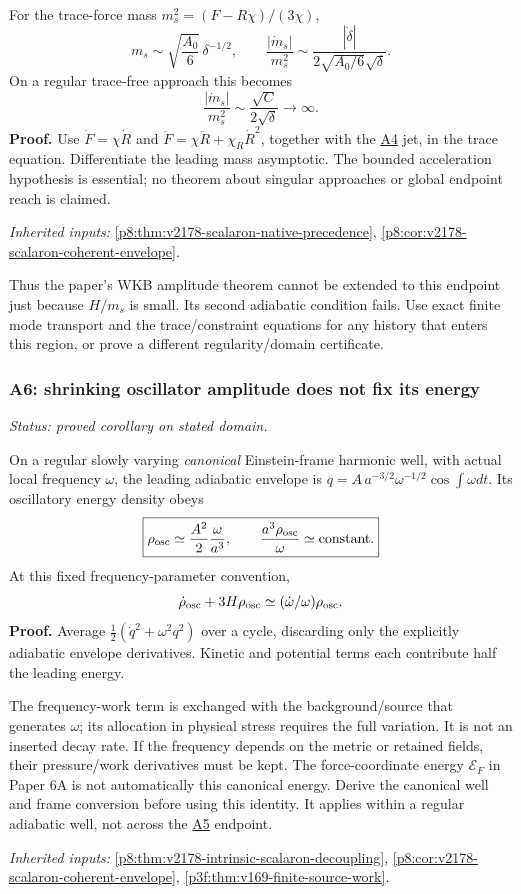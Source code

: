 \documentclass[12pt,a4paper]{article}
\begin{document}
For the trace-force mass
\(m_s^2=(F-R\chi)/(3\chi)\),
\[
m_s\sim\sqrt{\frac{A_0}{6}}\,\delta^{-1/2},\qquad
\frac{|\dot m_s|}{m_s^2}\sim
\frac{|\dot\delta|}{2\sqrt{A_0/6}\sqrt\delta}.
\]
On a regular trace-free approach this becomes
\[
\boxed{\frac{|\dot m_s|}{m_s^2}\sim
\frac{\sqrt C}{2\sqrt\delta}\longrightarrow\infty.}
\]
\textbf{Proof.} Use \(\dot F=\chi\dot R\) and
\(\ddot F=\chi\ddot R+\chi_R\dot R^2\), together with the \hyperref[p3f:sec:v2201-derived-a4]{A4} jet, in
the trace equation. Differentiate the leading mass asymptotic. The bounded
acceleration hypothesis is essential; no theorem about singular approaches
or global endpoint reach is claimed.
\par\noindent\textit{Inherited inputs:} \ref{p8:thm:v2178-scalaron-native-precedence}, \ref{p8:cor:v2178-scalaron-coherent-envelope}.

Thus the paper's WKB amplitude theorem cannot be extended to this endpoint
just because \(H/m_s\) is small. Its second adiabatic condition fails.
Use exact finite mode transport and the trace/constraint equations for any
history that enters this region, or prove a different regularity/domain
certificate.

\subsubsection{A6: shrinking oscillator amplitude does not fix its energy}
\label{p8:sec:v2201-derived-a6}
\noindent\textit{Status: proved corollary on stated domain.}

On a regular slowly varying \emph{canonical} Einstein-frame harmonic well,
with actual local frequency \(\omega\), the leading adiabatic envelope is
\(q=A\,a^{-3/2}\omega^{-1/2}\cos\int\omega dt\). Its oscillatory energy
density obeys
\[
\boxed{\rho_{\rm osc}\simeq\frac{A^2}{2}\frac{\omega}{a^3},\qquad
\frac{a^3\rho_{\rm osc}}{\omega}\simeq\text{constant}.}
\]
At this fixed frequency-parameter convention,
\[
\dot\rho_{\rm osc}+3H\rho_{\rm osc}
 \simeq(\dot\omega/\omega)\rho_{\rm osc}.
\]
\textbf{Proof.} Average \(\tfrac12(\dot q^2+\omega^2q^2)\) over a cycle,
discarding only the explicitly adiabatic envelope derivatives. Kinetic and
potential terms each contribute half the leading energy.

The frequency-work term is exchanged with the background/source that
generates \(\omega\); its allocation in physical stress requires the full
variation. It is not an inserted decay rate. If the frequency depends on the
metric or retained fields, their pressure/work derivatives must be kept.
The force-coordinate energy \(\mathcal E_F\) in Paper 6A is not automatically
this canonical energy. Derive the canonical well and frame conversion before
using this identity. It applies within a regular adiabatic well, not across
the \hyperref[p8:sec:v2201-derived-a5]{A5} endpoint. \par\noindent\textit{Inherited inputs:} \ref{p8:thm:v2178-intrinsic-scalaron-decoupling}, \ref{p8:cor:v2178-scalaron-coherent-envelope}, \ref{p3f:thm:v169-finite-source-work}.
\end{document}

